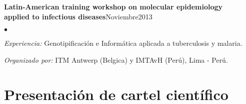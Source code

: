 \documentclass[margin,line]{res}
\newenvironment{list2}{
	\begin{list}{$\bullet$}{%
			\setlength{\itemsep}{0in}
			\setlength{\parsep}{0in} \setlength{\parskip}{0in}
			\setlength{\topsep}{0in} \setlength{\partopsep}{0in}
			\setlength{\leftmargin}{0.2in}}}{\end{list}}
\begin{document}
\begin{resume}
		
		
		
		
		{\bf Latin-American training workshop on molecular epidemiology \\applied to infectious diseases}\hfill {Noviembre2013}\\
		\vspace*{-.1in}%
		\begin{list2} %
			\item \textit{Experiencia:} Genotipificación e Informática aplicada a tuberculosis y malaria. %
			\item \textit{Organizado por:} ITM Antwerp (Belgica) y IMTAvH (Perú), Lima - Perú.\\
		\end{list2}
		
		
		
		\section{\sc Presentación de cartel científico}
		

\end{resume}
\end{document}
